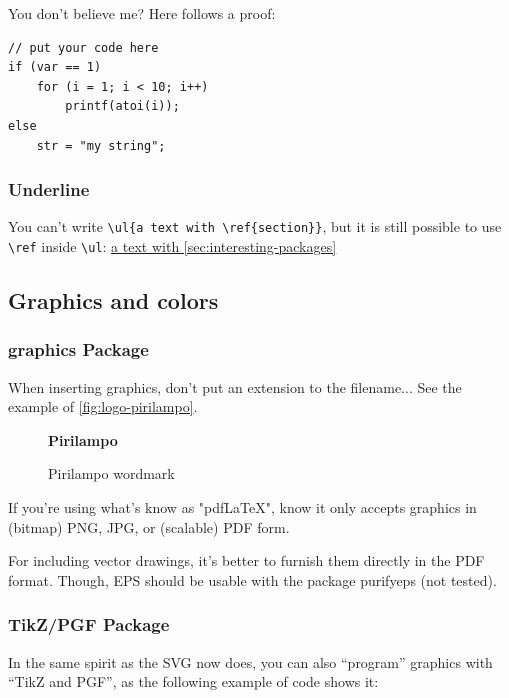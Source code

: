 \documentclass{boostreport}
\begin{document}
You don't believe me?  Here follows a proof:

\lstset{language=C}
\begin{lstlisting}
// put your code here
if (var == 1)
    for (i = 1; i < 10; i++)
        printf(atoi(i));
else
    str = "my string";
\end{lstlisting}

\subsubsection{Underline}

You can't write \verb|\ul{a text with \ref{section}}|, but it is still
possible to use \verb|\ref| inside \verb|\ul|:
\ul{a text with \mbox{\autoref{sec:interesting-packages}}}

\subsection{Graphics and colors}
\label{sec:graphics-colors}

\subsubsection{graphics Package}

When inserting graphics, don't put an extension to the filename... See the
example of \autoref{fig:logo-pirilampo}.

\begin{figure}[!ht]
    \centering
    {\sffamily\bfseries Pirilampo}
    \caption{Pirilampo wordmark}
    \label{fig:logo-pirilampo}
\end{figure}

If you're using what's know as "pdfLaTeX", know it only accepts graphics in
(bitmap) PNG, JPG, or (scalable) PDF form.

\begin{boostnote}
    For including vector drawings, it's better to furnish them directly in
    the PDF format.
    Though, EPS should be usable with the package purifyeps (not tested).
\end{boostnote}

\subsubsection{TikZ/PGF Package}

In the same spirit as the \acs{SVG} now does, you can also ``program''
graphics with ``TikZ and PGF'', as the following example of code shows it:
\end{document}

